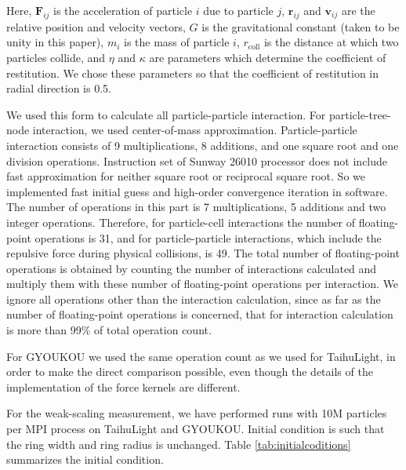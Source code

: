 \documentclass[conference]{IEEEtran}
\begin{document}
Here, ${\bm F_{ij}}$ is the acceleration of particle $i$ due to
particle $j$, ${\bm r_{ij}}$ and ${\bm v_{ij}}$ are the
relative position and velocity vectors, $G$ is the gravitational
constant (taken to be unity in this paper), $m_i$ is the mass of
particle $i$,  $r_\text{coll}$ is the distance at which
two particles collide, and $\eta$ and $\kappa$ are parameters which
determine the coefficient of restitution. We chose these parameters 
so that the coefficient of restitution in radial direction is 0.5.

We used this form to calculate all particle-particle interaction. For
particle-tree-node interaction, we used center-of-mass
approximation. Particle-particle interaction consists of 9
multiplications, 8 additions, and one square root and one division
operations. Instruction set of Sunway 26010 processor does not include
fast approximation for neither square root or reciprocal square
root. So we implemented fast initial guess and high-order
 convergence iteration in software. The number of
operations in this part is 7 multiplications, 5
additions and two integer operations. Therefore, for particle-cell interactions the number of
floating-point operations is 31, and for particle-particle
interactions, which include the repulsive force during physical
collisions, is 49.  The total number of floating-point operations is
obtained by counting the number of interactions calculated and
multiply them with these number of floating-point operations per
interaction. We ignore all operations other than the interaction
calculation, since as far as the number of floating-point operations is
concerned, that for interaction calculation is more than 99\% of total
operation count.

For GYOUKOU  we used the same operation count as we used for
TaihuLight, in order to make the direct comparison possible, even
though the details of the implementation of the force kernels are different.

For the weak-scaling measurement, we have performed runs with 10M
particles per MPI process on TaihuLight and GYOUKOU. Initial condition
is such that the ring width and ring radius is unchanged. Table
\ref{tab:initialcoditions}  summarizes the initial condition.
\end{document}
